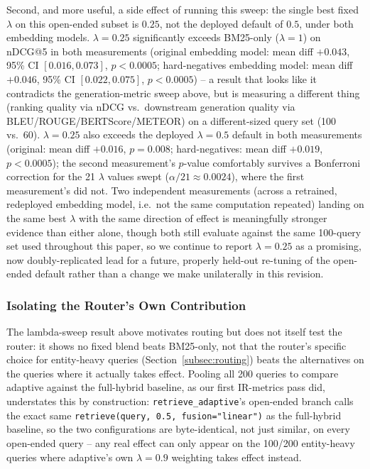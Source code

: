 \documentclass[a4paper,twoside]{article}
\begin{document}
Second, and more useful, a side effect of running this sweep: the single best fixed $\lambda$ on this open-ended subset is $0.25$, not the deployed default of $0.5$, under both embedding models. $\lambda=0.25$ significantly exceeds BM25-only ($\lambda=1$) on nDCG@5 in both measurements (original embedding model: mean diff $+0.043$, 95\% CI $[0.016, 0.073]$, $p<0.0005$; hard-negatives embedding model: mean diff $+0.046$, 95\% CI $[0.022, 0.075]$, $p<0.0005$) -- a result that looks like it contradicts the generation-metric sweep above, but is measuring a different thing (ranking quality via nDCG vs.\ downstream generation quality via BLEU/ROUGE/BERTScore/METEOR) on a different-sized query set (100 vs.\ 60). $\lambda=0.25$ also exceeds the deployed $\lambda=0.5$ default in both measurements (original: mean diff $+0.016$, $p=0.008$; hard-negatives: mean diff $+0.019$, $p<0.0005$); the second measurement's $p$-value comfortably survives a Bonferroni correction for the 21 $\lambda$ values swept ($\alpha/21\approx0.0024$), where the first measurement's did not. Two independent measurements (across a retrained, redeployed embedding model, i.e.\ not the same computation repeated) landing on the same best $\lambda$ with the same direction of effect is meaningfully stronger evidence than either alone, though both still evaluate against the same 100-query set used throughout this paper, so we continue to report $\lambda=0.25$ as a promising, now doubly-replicated lead for a future, properly held-out re-tuning of the open-ended default rather than a change we make unilaterally in this revision.

\subsubsection{Isolating the Router's Own Contribution}
\label{subsec:adaptive-isolated}

The lambda-sweep result above motivates routing but does not itself test the router: it shows no fixed blend beats BM25-only, not that the router's specific choice for entity-heavy queries (Section~\ref{subsec:routing}) beats the alternatives on the queries where it actually takes effect. Pooling all 200 queries to compare adaptive against the full-hybrid baseline, as our first IR-metrics pass did, understates this by construction: \texttt{retrieve\_adaptive}'s open-ended branch calls the exact same \texttt{retrieve(query, 0.5, fusion="linear")} as the full-hybrid baseline, so the two configurations are byte-identical, not just similar, on every open-ended query -- any real effect can only appear on the 100/200 entity-heavy queries where adaptive's own $\lambda=0.9$ weighting takes effect instead.
\end{document}
